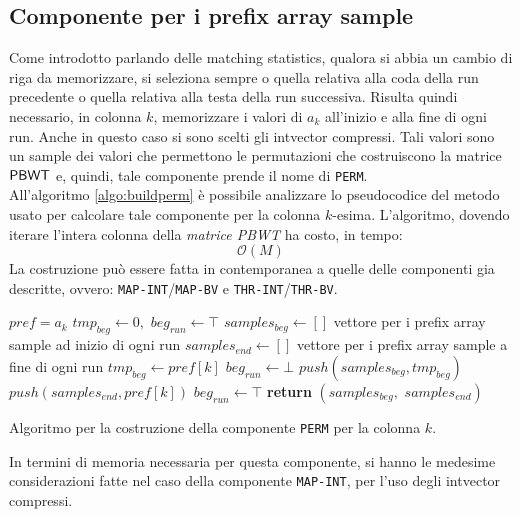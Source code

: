 \subsection{Componente per i prefix array sample}
Come introdotto parlando delle matching statistics, qualora si abbia un
cambio di riga da memorizzare, si seleziona sempre o quella relativa alla coda
della run precedente o quella relativa alla testa della run successiva. Risulta
quindi necessario, in colonna $k$, memorizzare i valori di $a_k$ all'inizio e
alla fine di ogni run. Anche in questo caso si sono scelti gli intvector
compressi. Tali valori sono un sample dei valori che permettono 
le permutazioni che costruiscono la matrice $\mbox{\rm {\sf PBWT}}$ e, quindi, tale
componente prende il nome di \texttt{PERM}.\\
All'algoritmo \ref{algo:buildperm} è possibile analizzare lo pseudocodice del
metodo usato per calcolare tale componente per la colonna
$k$-esima. L'algoritmo, dovendo iterare l'intera colonna della \textit{matrice
  PBWT} ha costo, in tempo:
\begin{equation}
  \label{eq:timeperm}
  \mathcal{O}(M)
\end{equation}
La costruzione può essere fatta in contemporanea a quelle delle componenti gia
descritte, ovvero: 
\texttt{MAP-INT}/\texttt{MAP-BV} e \texttt{THR-INT}/\texttt{THR-BV}.
\begin{algorithm}
  \small
  \begin{algorithmic}[1]
    \Comment $pref = a_k$
    \State $tmp_{beg}\gets 0,\,\,beg_{run}\gets \top$
    \State $samples_{beg} \gets []$
    \Comment vettore per i prefix array sample ad inizio di ogni run
    \State $samples_{end}\gets []$
    \Comment vettore per i prefix array sample a fine di ogni run
    \For {\textit{every} $k\in\left[0,\,\, height\right)$}
    \State $tmp_{beg}\gets pref[k]$
    \State $beg_{run}\gets \bot$
    \EndIf
    \State $push(samples_{beg}, tmp_{beg})$
    \State $push(samples_{end}, pref[k])$
    \State $beg_{run}\gets \top$
    \EndIf
    \EndFor
    \State \textbf{return} $(samples_{beg},\,\, samples_{end})$  
    \EndFunction
  \end{algorithmic}
  \caption{{\footnotesize{Algoritmo per la costruzione della componente
  \texttt{PERM} per la colonna $k$.}}}
  \label{algo:buildperm}
\end{algorithm}
\noindent
In termini di memoria necessaria per questa componente, si hanno le medesime
considerazioni fatte nel caso della componente \texttt{MAP-INT}, per l'uso degli
intvector compressi.